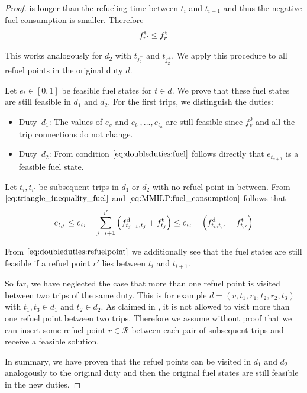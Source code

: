 \begin{proof}
is longer than the refueling time between $t_i$ and $t_{i+1}$ and thus the negative fuel consumption is smaller. Therefore
\begin{align}
	f^{\operatorname{t}}_{r'}\leq f^{\operatorname{t}}_{r} \label{eq:doubleduties:refuelpoint}
\end{align}

This works analogously for $d_2$ with $t_{j^-_2}$ and $t_{j^+_2}$. We apply this procedure to all refuel points in the original duty $d$.

Let $e_t\in[0,1]$ be feasible fuel states for ${t\in d}$. We prove that these fuel states are still feasible in $d_1$ and $d_2$. For the first trips, we distinguish the duties:
\begin{itemize}
	\item{Duty~$d_1$:}
		The values of $e_v$ and ${e_{t_1},\dots,e_{t_a}}$ are still feasible since $f^0_v$ and all the trip connections do not change.
	\item{Duty~$d_2$:}
		From condition $\eqref{eq:doubleduties:fuel}$ follows directly that $e_{t_{a+1}}$ is a feasible fuel state.
\end{itemize}

Let $t_i,t_{i'}$ be subsequent trips in $d_1$ or $d_2$ with no refuel point in-between. From $\eqref{eq:triangle_inequality_fuel}$ and $\eqref{eq:MMILP:fuel_consumption}$ follows that
\begin{align*}
	e_{t_{i'}} \leq e_{t_i} - \sum_{j=i+1}^{i'} \left(f^{\operatorname{d}}_{t_{j-1},t_j}+f^{\operatorname{t}}_{t_j}\right) \leq e_{t_i} - \left(f^{\operatorname{d}}_{t_i,t_{i'}} + f^{\operatorname{t}}_{t_{i'}}\right)
\end{align*}

From $\eqref{eq:doubleduties:refuelpoint}$ we additionally see that the fuel states are still feasible if a refuel point $r'$ lies between $t_i$ and $t_{i+1}$.

So far, we have neglected the case that more than one refuel point is visited between two trips of the same duty. This is for example ${d=\left(v,t_1,r_1,t_2,r_2,t_3\right)}$ with ${t_1,t_3\in d_1}$ and ${t_2\in d_2}$. As claimed in , it is not allowed to visit more than one refuel point between two trips. Therefore we assume without proof that we can insert some refuel point ${r\in\mathcal{R}}$ between each pair of subsequent trips and receive a feasible solution.

In summary, we have proven that the refuel points can be visited in $d_1$ and $d_2$ analogously to the original duty and then the original fuel states are still feasible in the new duties.


\end{proof}

